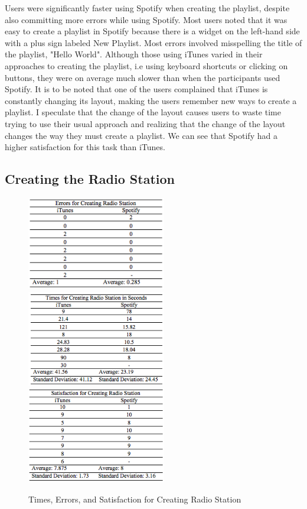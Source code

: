 \documentclass[11pt]{article}
\begin{document}
Users were significantly faster using Spotify when creating the playlist, despite also committing more errors while using Spotify. Most users noted  that it was easy to create a playlist in Spotify because there is a widget on the left-hand side with a plus sign labeled New Playlist. Most errors involved misspelling the title of the playlist, "Hello World". Although those using iTunes varied in their approaches to creating the playlist, i.e using keyboard shortcuts or clicking on buttons, they were on average much slower than when the participants used Spotify. It is to be noted that one of the users complained that iTunes is constantly changing its layout, making the users remember new ways to create a playlist. I speculate that the change of the layout causes users to waste time trying to use their usual approach and realizing that the change of the layout changes the way they must create a playlist. We can see that Spotify had a higher satisfaction for this task than iTunes. 

\subsection{Creating the Radio Station}

\begin{figure}[H] %
   \centering
   \includegraphics[width=2.4in]{errors_radio.png}       
   \includegraphics[width=2.4in]{times_radio.png} 
   \includegraphics[width=2.4in]{satisfaction_radio.png}    
   \caption{Times, Errors, and Satisfaction for Creating Radio Station}
   \label{fig:radio}
\end{figure}
\end{document}
